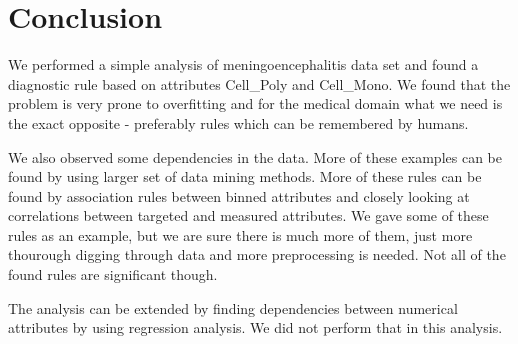 \documentclass[11pt]{article}
\begin{document}
\section{Conclusion}
We performed a simple analysis of meningoencephalitis data set and found a
diagnostic rule based on attributes Cell\_Poly and Cell\_Mono. We found that
the problem is very prone to overfitting and for the medical domain what we
need is the exact opposite - preferably rules which can be remembered by
humans. 

We also observed some dependencies in the data. More of these examples can be
found by using larger set of data mining methods.  More of these rules can be
found by association rules between binned attributes and closely looking at
correlations between targeted and measured attributes. We gave some of these
rules as an example, but we are sure there is much more of them, just more
thourough digging through data and more preprocessing is needed. Not all of the
found rules are significant though.

The analysis can be extended by finding dependencies between numerical
attributes by using regression analysis. We did not perform that in this
analysis.








% 



\end{document}
